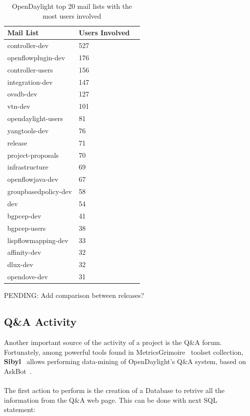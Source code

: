 \documentclass[a4paper, 12pt]{book}
\begin{document}
\begin{table}[H]
\footnotesize
\begin{center}
\begin{tabular}{|l|l|p{3cm}|}
\hline
\textbf{Mail List} & \textbf{Users Involved} \\ \hline
controller-dev & 527 \\ \hline
openflowplugin-dev & 176 \\ \hline
controller-users & 156 \\ \hline
integration-dev & 147 \\ \hline
ovsdb-dev & 127 \\ \hline
vtn-dev & 101 \\ \hline
opendaylight-users & 81 \\ \hline
yangtools-dev & 76 \\ \hline
release & 71 \\ \hline
project-proposals & 70 \\ \hline
infrastructure & 69 \\ \hline
openflowjava-dev & 67 \\ \hline
groupbasedpolicy-dev & 58 \\ \hline
dev & 54 \\ \hline
bgpcep-dev & 41 \\ \hline
bgpcep-users & 38 \\ \hline
lispflowmapping-dev & 33 \\ \hline
affinity-dev & 32 \\ \hline
dlux-dev & 32 \\ \hline
opendove-dev & 31 \\ \hline
\end{tabular}
\end{center}
\caption{OpenDaylight top 20 mail lists with the most users involved}
\label{tab:odl_top_maillists}
\end{table}

PENDING: Add comparison between releases?

\subsection{Q\&A Activity}
Another important source of the activity of a project is the Q\&A forum. Fortunately, among powerful tools found in MetricsGrimoire~\cite{MetricsGrimore} toolset collection, \textbf{Sibyl}~\cite{Sibyl} allows performing data-mining of OpenDaylight's Q\&A system, based on AskBot~\cite{AskBot}.\\
\\
The first action to perform is the creation of a Database to retrive all the information from the Q\&A web page. This can be done with next SQL statement:
\end{document}
